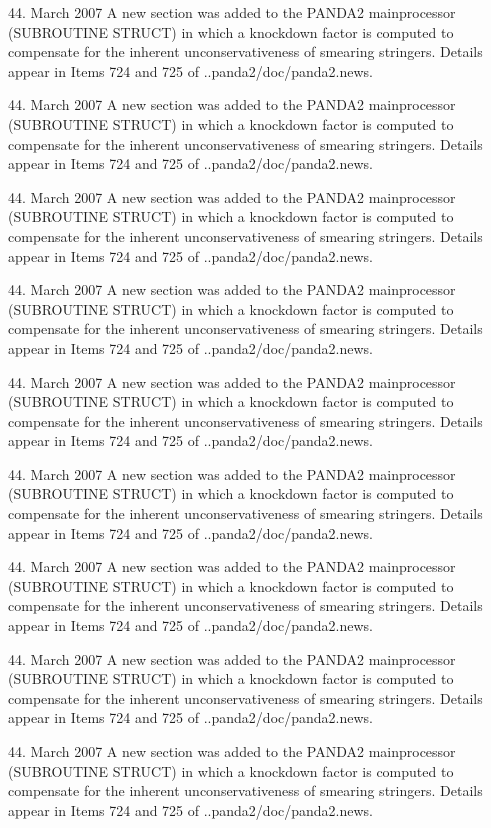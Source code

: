 44. March 2007
A new section was added to the PANDA2 mainprocessor (SUBROUTINE STRUCT) in
which a knockdown factor is computed to compensate for the inherent
unconservativeness of smearing stringers. Details appear in Items 724 and
725 of ..panda2/doc/panda2.news.

44. March 2007
A new section was added to the PANDA2 mainprocessor (SUBROUTINE STRUCT) in
which a knockdown factor is computed to compensate for the inherent
unconservativeness of smearing stringers. Details appear in Items 724 and
725 of ..panda2/doc/panda2.news.

44. March 2007
A new section was added to the PANDA2 mainprocessor (SUBROUTINE STRUCT) in
which a knockdown factor is computed to compensate for the inherent
unconservativeness of smearing stringers. Details appear in Items 724 and
725 of ..panda2/doc/panda2.news.

44. March 2007
A new section was added to the PANDA2 mainprocessor (SUBROUTINE STRUCT) in
which a knockdown factor is computed to compensate for the inherent
unconservativeness of smearing stringers. Details appear in Items 724 and
725 of ..panda2/doc/panda2.news.

44. March 2007
A new section was added to the PANDA2 mainprocessor (SUBROUTINE STRUCT) in
which a knockdown factor is computed to compensate for the inherent
unconservativeness of smearing stringers. Details appear in Items 724 and
725 of ..panda2/doc/panda2.news.

44. March 2007
A new section was added to the PANDA2 mainprocessor (SUBROUTINE STRUCT) in
which a knockdown factor is computed to compensate for the inherent
unconservativeness of smearing stringers. Details appear in Items 724 and
725 of ..panda2/doc/panda2.news.

44. March 2007
A new section was added to the PANDA2 mainprocessor (SUBROUTINE STRUCT) in
which a knockdown factor is computed to compensate for the inherent
unconservativeness of smearing stringers. Details appear in Items 724 and
725 of ..panda2/doc/panda2.news.

44. March 2007
A new section was added to the PANDA2 mainprocessor (SUBROUTINE STRUCT) in
which a knockdown factor is computed to compensate for the inherent
unconservativeness of smearing stringers. Details appear in Items 724 and
725 of ..panda2/doc/panda2.news.

44. March 2007
A new section was added to the PANDA2 mainprocessor (SUBROUTINE STRUCT) in
which a knockdown factor is computed to compensate for the inherent
unconservativeness of smearing stringers. Details appear in Items 724 and
725 of ..panda2/doc/panda2.news.

